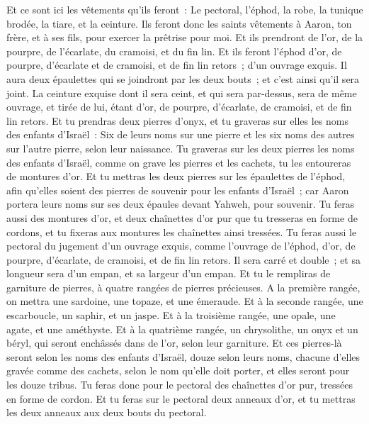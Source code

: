 \begin{multicols}{2}
Et ce sont ici les vêtements qu'ils feront~: Le pectoral, l'éphod, la robe, la tunique brodée, la tiare, et la ceinture. Ils feront donc les saints vêtements à Aaron, ton frère, et à ses fils, pour exercer la prêtrise pour moi.
Et ils prendront de l'or, de la pourpre, de l'écarlate, du cramoisi, et du fin lin.
Et ils feront l'éphod d'or, de pourpre, d'écarlate et de cramoisi, et de fin lin retors~; d'un ouvrage exquis.
Il aura deux épaulettes qui se joindront par les deux bouts~; et c'est ainsi qu'il sera joint.
La ceinture exquise dont il sera ceint, et qui sera par-dessus, sera de même ouvrage, et tirée de lui, étant d'or, de pourpre, d'écarlate, de cramoisi, et de fin lin retors.
Et tu prendras deux pierres d'onyx, et tu graveras sur elles les noms des enfants d'Israël~:
Six de leurs noms sur une pierre et les six noms des autres sur l'autre pierre, selon leur naissance.
Tu graveras sur les deux pierres les noms des enfants d'Israël, comme on grave les pierres et les cachets, tu les entoureras de montures d'or.
Et tu mettras les deux pierres sur les épaulettes de l'éphod, afin qu'elles soient des pierres de souvenir pour les enfants d'Israël~; car Aaron portera leurs noms sur ses deux épaules devant Yahweh, pour souvenir.
Tu feras aussi des montures d'or,
et deux chaînettes d'or pur que tu tresseras en forme de cordons, et tu fixeras aux montures les chaînettes ainsi tressées.
Tu feras aussi le pectoral du jugement d'un ouvrage exquis, comme l'ouvrage de l'éphod, d'or, de pourpre, d'écarlate, de cramoisi, et de fin lin retors.
Il sera carré et double~; et sa longueur sera d'un empan, et sa largeur d'un empan.
Et tu le rempliras de garniture de pierres, à quatre rangées de pierres précieuses. A la première rangée, on mettra une sardoine, une topaze, et une émeraude.
Et à la seconde rangée, une escarboucle, un saphir, et un jaspe.
Et à la troisième rangée, une opale, une agate, et une améthyste.
Et à la quatrième rangée, un chrysolithe, un onyx et un béryl, qui seront enchâssés dans de l'or, selon leur garniture.
Et ces pierres-là seront selon les noms des enfants d'Israël, douze selon leurs noms, chacune d'elles gravée comme des cachets, selon le nom qu'elle doit porter, et elles seront pour les douze tribus.
Tu feras donc pour le pectoral des chaînettes d'or pur, tressées en forme de cordon.
Et tu feras sur le pectoral deux anneaux d'or, et tu mettras les deux anneaux aux deux bouts du pectoral.

\end{multicols}
